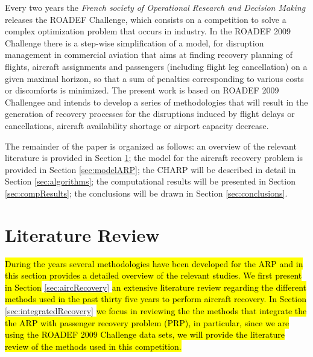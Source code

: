 \documentclass[ijoo,nonblindrev]{informs-ijoo}
\begin{document}
Every two years the \textit{French society of Operational Research and Decision Making} releases the ROADEF Challenge, which consists on a competition to solve a complex optimization problem that occurs in industry. In the ROADEF 2009 Challenge there is a step-wise simplification of a model, for disruption management in commercial aviation that aims at finding recovery planning of flights, aircraft assignments and passengers (including flight leg cancellation) on a given maximal horizon, so that a sum of penalties corresponding to various costs or discomforts is minimized. The present work is based on ROADEF 2009 Challengee and intends to develop a series of methodologies that will result in the generation of recovery processes for the disruptions induced by flight delays or cancellations, aircraft availability shortage or airport capacity decrease.\\
\begin{comment}
After retrieving the results for the ARRP using our algorithm, we will validate it using a flight schedule based on citep francis2020
\end{comment}


The remainder of the paper is organized as follows: an overview of the relevant literature is provided in Section \ref{sec:litRev}; the model for the aircraft  recovery problem is provided in Section \ref{sec:modelARP}; the  CHARP will be described in detail in Section \ref{sec:algorithms}; the computational results will be presented in Section \ref{sec:compResults}; the conclusions will be drawn in Section \ref{sec:conclusions}.


\section{Literature Review}\label{sec:litRev}


 \hl{During the years several methodologies have been developed for the ARP and in this section provides a detailed overview of the relevant studies. We first present in Section} \ref{sec:aircRecovery} \hl{an extensive literature review regarding the different methods used in the past thirty five years to perform aircraft recovery. In Section} \ref{sec:integratedRecovery} \hl{ we focus in reviewing the the methods that integrate the the ARP with passenger recovery problem (PRP), in particular, since we are using the ROADEF 2009 Challenge data sets, we will provide the literature review of the methods used in this competition.}
\end{document}
